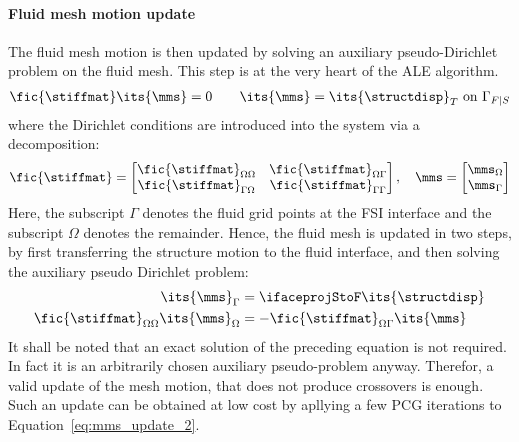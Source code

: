\documentclass[../main.tex]{subfiles}
\begin{document}
\paragraph{\raisebox{.5pt}{\textcircled{\raisebox{-.9pt} {3}}} Fluid mesh motion update}
The fluid mesh motion is then updated by solving an auxiliary pseudo-Dirichlet problem on the fluid mesh. This step is at the very heart of the \ac{ALE} algorithm.
\begin{align}
\fic{\stiffmat} \its{\mms} = 0~~~\text{}~~~\its{\mms}=\its{\structdisp}_T~\text{on}~\Gamma_{F|S}
\end{align}
where the Dirichlet conditions are introduced into the system via a decomposition:
\begin{align}
\fic{\stiffmat}=
\begin{bmatrix}
\fic{\stiffmat}_{\Omega\Omega}   &  \fic{\stiffmat}_{\Omega\Gamma}   \\
\fic{\stiffmat}_{\Gamma\Omega}   &  \fic{\stiffmat}_{\Gamma\Gamma}   \\
\end{bmatrix},~~~
\mms=
\begin{bmatrix}
\mms_{\Omega} \\
\mms_{\Gamma} \\
\end{bmatrix}
\end{align}
Here, the subscript $\Gamma$ denotes the fluid grid points at the FSI interface and the subscript $\Omega$ denotes the remainder. Hence, the fluid mesh is updated in two steps, by first transferring the structure motion to the fluid interface, and then solving the auxiliary pseudo Dirichlet problem:
\begin{align}
\its{\mms}_{\Gamma}&=\ifaceprojStoF \its{\structdisp}\label{eq:mms_update_1}\\
\fic{\stiffmat}_{\Omega\Omega} \its{\mms}_\Omega &= -\fic{\stiffmat}_{\Omega\Gamma} \its{\mms} \label{eq:mms_update_2}
\end{align}
It shall be noted that an exact solution of the preceding equation is not required. In fact it is an arbitrarily chosen auxiliary pseudo-problem anyway. Therefor, a valid update of the mesh motion, that does not produce crossovers is enough. Such an update can be obtained at low cost by apllying a few \ac{PCG} iterations to Equation~\eqref{eq:mms_update_2}.
\end{document}
